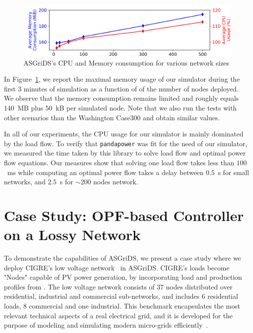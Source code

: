 \documentclass[conference]{IEEEtran}
\newcommand{\ignore}[1]{}
\begin{document}
\begin{figure}[htp]
	\centering%
	\includegraphics[width=1\linewidth]{mem_cpu.png}%
	\caption{ASGriDS's CPU and Memory consumption for various network sizes}%
	\label{sim_mem}
\end{figure}

In Figure~\ref{sim_mem}, we report the maximal memory usage of our simulator during the first 3 minutes of simulation as a function of of the number of nodes deployed.  We observe that the memory consumption remains limited and roughly equals $140$~MB plus $50$~kB per simulated node. Note that we also run the tests with other scenarios than the Washington Case300 and obtain similar values. 

In all of our experiments, the CPU usage for our simulator is mainly dominated by the load flow\ignore{solver that runs in an asynchronous while true loop (in order to be maintained up to date)}. To verify that \texttt{pandapower} was fit for the need of our simulator, we measured the time taken by this library to solve load flow and optimal power flow equations. Our measures show that solving one load flow takes less than $100$~ms while computing an optimal power flow takes a delay between $0.5$~s for small networks, and $2.5$~s for $\sim$200 nodes network.

\section{Case Study: OPF-based Controller on a Lossy Network}\label{case_study}
\label{sec:case_study}


To demonstrate the capabilities of ASGriDS, we present a case study where we deploy CIGRE's low voltage network~\cite{BenchmarkSystemsNetwork2011}\ignore{ depicted in Figure~\ref{cigre_lv}} in ASGriDS. CIGRE's loads become "Nodes" capable of PV power generation, by incorporating load and production profiles from \cite{espinosa2015dissemination}. The low voltage network consists of 37 nodes distributed over residential, industrial and commercial sub-networks, and includes 6 residential loads, 8 commercial and one industrial. This benchmark encapsulates the most relevant technical aspects of a real electrical grid, and it is developed for the purpose of modeling and simulating modern micro-grids efficiently~\cite{papathanassiouBENCHMARKLOWVOLTAGE}.
\end{document}
